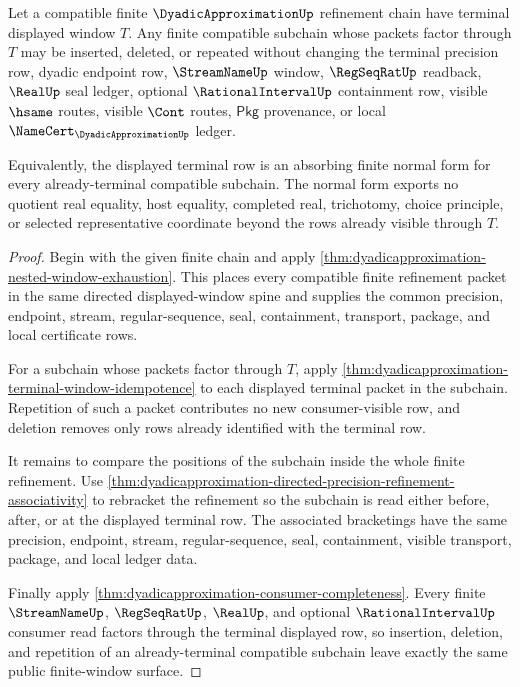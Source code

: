 \begin{theorem}
\label{thm:dyadicapproximation-terminal-window-subchain-absorption}
Let a compatible finite $\DyadicApproximationUp$ refinement chain have terminal
displayed window $T$. Any finite compatible subchain whose packets factor
through $T$ may be inserted, deleted, or repeated without changing the terminal
precision row, dyadic endpoint row, $\StreamNameUp$ window,
$\RegSeqRatUp$ readback, $\RealUp$ seal ledger, optional
$\RationalIntervalUp$ containment row, visible $\hsame$ routes, visible
$\Cont$ routes, $\mathsf{Pkg}$ provenance, or local
$\NameCert_{\DyadicApproximationUp}$ ledger.

Equivalently, the displayed terminal row is an absorbing finite normal form for
every already-terminal compatible subchain. The normal form exports no quotient
real equality, host equality, completed real, trichotomy, choice principle, or
selected representative coordinate beyond the rows already visible through
$T$.
\end{theorem}
\begin{proof}
Begin with the given finite chain and apply
\autoref{thm:dyadicapproximation-nested-window-exhaustion}. This places every
compatible finite refinement packet in the same directed displayed-window
spine and supplies the common precision, endpoint, stream, regular-sequence,
seal, containment, transport, package, and local certificate rows.

For a subchain whose packets factor through $T$, apply
\autoref{thm:dyadicapproximation-terminal-window-idempotence} to each displayed
terminal packet in the subchain. Repetition of such a packet contributes no new
consumer-visible row, and deletion removes only rows already identified with
the terminal row.

It remains to compare the positions of the subchain inside the whole finite
refinement. Use
\autoref{thm:dyadicapproximation-directed-precision-refinement-associativity}
to rebracket the refinement so the subchain is read either before, after, or at
the displayed terminal row. The associated bracketings have the same precision,
endpoint, stream, regular-sequence, seal, containment, visible transport,
package, and local ledger data.

Finally apply \autoref{thm:dyadicapproximation-consumer-completeness}. Every
finite $\StreamNameUp$, $\RegSeqRatUp$, $\RealUp$, and optional
$\RationalIntervalUp$ consumer read factors through the terminal displayed row,
so insertion, deletion, and repetition of an already-terminal compatible
subchain leave exactly the same public finite-window surface.
\end{proof}

